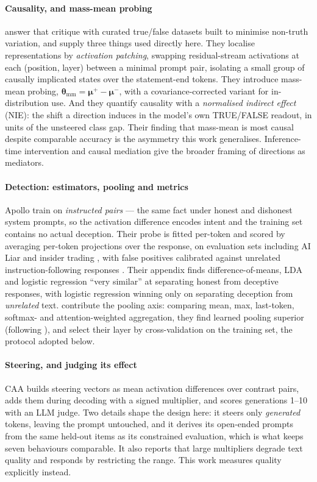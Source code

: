 \documentclass[conference]{IEEEtran}
\begin{document}
\paragraph{Causality, and mass-mean probing}
\citet{marks2024} answer that critique with curated true/false datasets built to
minimise non-truth variation, and supply three things used directly here. They
localise representations by \emph{activation patching}, swapping residual-stream
activations at each (position, layer) between a minimal prompt pair, isolating a
small group of causally implicated states over the statement-end tokens. They
introduce mass-mean probing, $\boldsymbol{\theta}_{\mathrm{mm}} =
\boldsymbol{\mu}^{+} - \boldsymbol{\mu}^{-}$, with a covariance-corrected variant
for in-distribution use. And they quantify causality with a \emph{normalised
indirect effect} (NIE): the shift a direction induces in the model's own TRUE/FALSE
readout, in units of the unsteered class gap. Their finding that mass-mean is most
causal despite comparable accuracy is the asymmetry this work generalises.
Inference-time intervention \citep{li2023} and causal mediation
\citep{vig2020,meng2022} give the broader framing of directions as mediators.

\paragraph{Detection: estimators, pooling and metrics}
Apollo \citep{goldowsky2025} train on \emph{instructed pairs} --- the same fact
under honest and dishonest system prompts, so the activation difference encodes
intent and the training set contains no actual deception. Their probe is fitted
per-token and scored by averaging per-token projections over the response, on
evaluation sets including AI Liar \citep{pacchiardi2024} and insider trading
\citep{scheurer2023}, with false positives calibrated against unrelated
instruction-following responses \citep{taori2023}. Their appendix finds
difference-of-means, LDA and logistic regression ``very similar'' at separating
honest from deceptive responses, with logistic regression winning only on
separating deception from \emph{unrelated} text. \citet{mckenzie2025} contribute
the pooling axis: comparing mean, max, last-token, softmax- and
attention-weighted aggregation, they find learned pooling superior (following
\citealt{kantamneni2025}), and select their layer by cross-validation on the
training set, the protocol adopted below.

\paragraph{Steering, and judging its effect}
CAA \citep{rimsky2024} builds steering vectors as mean activation differences over
contrast pairs, adds them during decoding with a signed multiplier, and scores
generations 1--10 with an LLM judge. Two details shape the design here: it steers
only \emph{generated} tokens, leaving the prompt untouched, and it derives its
open-ended prompts from the same held-out items as its constrained evaluation,
which is what keeps seven behaviours comparable. It also reports that large
multipliers degrade text quality and responds by restricting the range. This work
measures quality explicitly instead.
\end{document}
